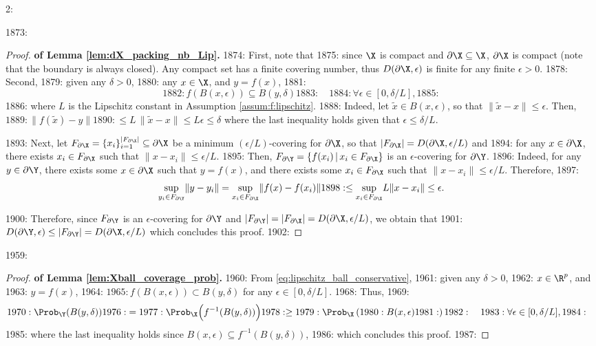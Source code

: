 2: \documentclass[12pt]{l4dc2022} %
\begin{document}
1873: \begin{proof}\textbf{of Lemma \ref{lem:dX_packing_nb_Lip}.} 
1874: First, note that 
1875: since $\X$ is compact and $\partial\X\subseteq\X$, $\partial\X$ is compact (note that the boundary is always closed). Any compact set has a finite covering number, thus $D(\partial\X, \epsilon)$ is finite for any finite $\epsilon>0$. 
1878: Second,   
1879: given any $\delta>0$, 
1880: any $x\in\X$, and $y=f(x)$,
1881: \begin{equation}\label{eq:lipschitz_ball_conservative}
1882: f(B(x,\epsilon)) \subseteq B(y,\delta)
1883: \quad
1884: \forall \epsilon\in[0,\delta/L],
1885: \end{equation}
1886: where $L$ is the Lipschitz constant in Assumption \ref{assum:f:lipschitz}. %
1888: Indeed, let $\tilde{x}\in B(x,\epsilon)$, so that $\|\tilde{x}-x\|\leq\epsilon$. Then, $
1889: \|f(\tilde{x})-y\|
1890: \leq L\,\|\tilde{x}-x\|\leq L\epsilon\leq\delta$ where the last inequality holds given that $\epsilon \leq \delta/L$. 

1893: Next, let $F_{\partial\X}=\{x_i\}_{i=1}^{|F_{\partial\X}|}\subseteq\partial\X$ be a minimum $(\epsilon/L)$-covering for $\partial\X$, so that $|F_{\partial\X}|=D(\partial\X,\epsilon/L)$ and 
1894:  for any $x\in\partial\X$, there exists $x_i\in F_{\partial\X}$ such that $\|x-x_i\|\leq \epsilon/L$. %
1895: Then, $F_{\partial\Y}=\{f(x_i)\, |\,x_i\in F_{\partial\X} \}$ is an $\epsilon$-covering for $\partial\Y$. 
1896: 	Indeed, for any $y\in\partial\Y$, there exists some $x\in\partial\X$ such that $y=f(x)$, and there exists some $x_i\in F_{\partial\X}$ such that $\|x-x_i\|\leq \epsilon/L$. Therefore, 
1897: 	$$\underset{y_i\in F_{\partial\Y}}{\sup} \|y-y_i\| = \underset{x_i\in F_{\partial\X}}{\sup} \|f(x)-f(x_i)\| 
1898: \leq \underset{x_i\in F_{\partial\X}}{\sup} L\|x-x_i\| \leq \epsilon.$$ 

1900: Therefore, since $F_{\partial\Y}$ is an $\epsilon$-covering for $\partial\Y$ and $|F_{\partial\Y}|=|F_{\partial\X}|=D(\partial\X,\epsilon/L)$, we obtain that 
1901: $D(\partial\Y,\epsilon)\leq |F_{\partial\Y}| = D(\partial\X,\epsilon/L)$ which concludes this proof.
1902: \end{proof}

1959: \begin{proof}\textbf{of Lemma \ref{lem:Xball_coverage_prob}.}
1960: From \eqref{eq:lipschitz_ball_conservative}, 
1961: given any $\delta>0$, 
1962:  $x\in\R^p$, and 
1963:  $y=f(x)$, 
1964: $
1965: f(B(x,\epsilon)) \subset B(y,\delta)$ for any $\epsilon\in[0,\delta/L]$.
1968: Thus, \vspace{-3mm}
1969: \begin{align*}
1970: \Prob_{\Y}(B(y,\delta))
1976: &=
1977: \Prob_\X\Big(f^{-1}(B(y,\delta))\Big)
1978: \geq
1979: \Prob_\X\left(
1980: B(x,\epsilon)
1981: \right)
1982: \quad
1983: \forall \epsilon\in[0,\delta/L],
1984: \end{align*}
1985: where the last inequality holds since $B(x,\epsilon) \subseteq f^{-1}(B(y,\delta))$,
1986: which concludes this proof.
1987: \end{proof}
\end{document}
